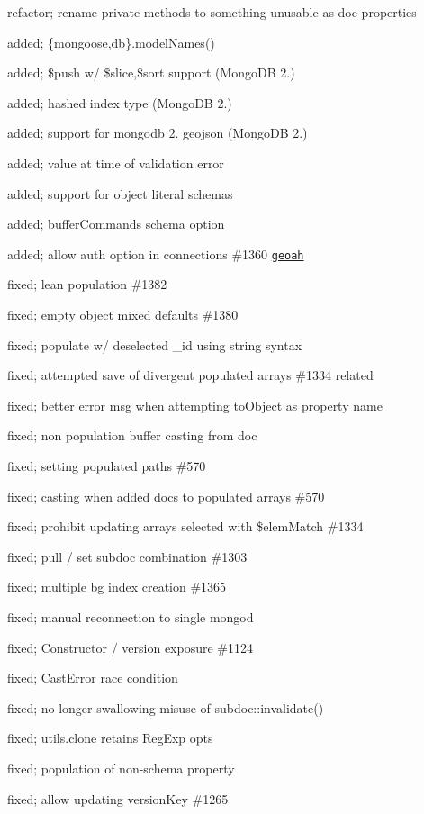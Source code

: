 \begin{DoxyItemize}
\item refactor; rename private methods to something unusable as doc properties
\item added; \{mongoose,db\}.model\+Names()
\item added; \$push w/ \$slice,\$sort support (Mongo\+DB 2.)
\item added; hashed index type (Mongo\+DB 2.)
\item added; support for mongodb 2. geojson (Mongo\+DB 2.)
\item added; value at time of validation error
\item added; support for object literal schemas
\item added; buffer\+Commands schema option
\item added; allow auth option in connections \#1360 \href{https://github.com/geoah}{\tt geoah}
\item fixed; lean population \#1382
\item fixed; empty object mixed defaults \#1380
\item fixed; populate w/ deselected \+\_\+id using string syntax
\item fixed; attempted save of divergent populated arrays \#1334 related
\item fixed; better error msg when attempting to\+Object as property name
\item fixed; non population buffer casting from doc
\item fixed; setting populated paths \#570
\item fixed; casting when added docs to populated arrays \#570
\item fixed; prohibit updating arrays selected with \$elem\+Match \#1334
\item fixed; pull / set subdoc combination \#1303
\item fixed; multiple bg index creation \#1365
\item fixed; manual reconnection to single mongod
\item fixed; Constructor / version exposure \#1124
\item fixed; Cast\+Error race condition
\item fixed; no longer swallowing misuse of subdoc\+::invalidate()
\item fixed; utils.\+clone retains Reg\+Exp opts
\item fixed; population of non-\/schema property
\item fixed; allow updating version\+Key \#1265

\end{DoxyItemize}
